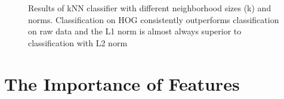 \begin{figure}[h!]
\centering

\caption{Results of kNN classifier with different neighborhood sizes (k) and norms. Classification on HOG consistently outperforms classification on raw data and the L1 norm is almost always superior to classification with L2 norm}

\end{figure}


\section{The Importance of Features} %
